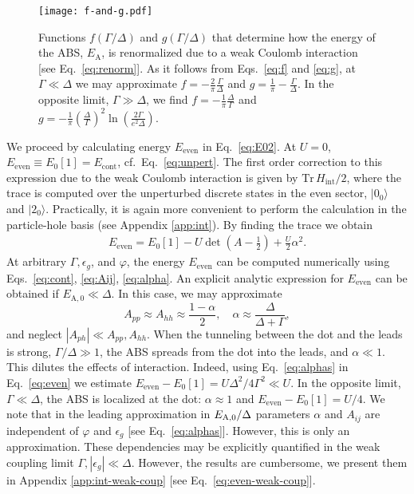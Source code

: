 \documentclass[aps,reprint,longbibliography, prb]{revtex4-2}
\begin{document}
\begin{figure}[t]
  \begin{center}
    \hspace{-20pt}\texttt{[image: f-and-g.pdf]}
    \caption{Functions $f(\Gamma/\Delta)$ and $g(\Gamma/\Delta)$ that determine how the energy of the ABS, $E_\mathrm{A}$, is renormalized due to a weak Coulomb interaction [see Eq.~\eqref{eq:renorm}]. As it follows from Eqs.~\eqref{eq:f} and \eqref{eq:g}, at $\Gamma\ll\Delta$ we may approximate $f = - \frac{2}{\pi}\frac{\Gamma}{\Delta}$ and $g = \frac{1}{\pi} - \frac{\Gamma}{\Delta}$. In the opposite limit, $\Gamma \gg \Delta$, we find $f= -\frac{1}{\pi}\frac{\Delta}{\Gamma}$ and $g=-\frac{1}{\pi}\left(\frac{\Delta}{\Gamma}\right)^2\ln\left(\frac{2\Gamma}{e^2\Delta}\right)$.
    \label{fig:f-and-g}}
  \end{center}
\end{figure}

We proceed by calculating energy $E_\mathrm{even}$ in Eq.~\eqref{eq:E02}. At $U = 0$, $E_\mathrm{even} \equiv E_0[1] = E_\mathrm{cont}$, cf.~Eq.~\eqref{eq:unpert}. The first order correction to this expression due to the weak Coulomb interaction is given by $\mathrm{Tr}\,H_\mathrm{int}/2$, where the trace is computed over the unperturbed discrete states in the even sector, $|0_0\rangle$ and $|2_0\rangle$. Practically, it is again more convenient to perform the calculation in the particle-hole basis (see Appendix \ref{app:int}). By finding the trace we obtain
\begin{gather}
    \label{eq:even}
    E_\mathrm{even} = E_0[1] - U\det\left(A - \frac{1}{2}\right) + \frac{U}{2}\alpha^2.
\end{gather}
At arbitrary $\Gamma,\epsilon_g$, and $\varphi$, the energy $E_\mathrm{even}$ can be computed numerically using Eqs.~\eqref{eq:cont}, \eqref{eq:Aij}, \eqref{eq:alpha}. An explicit analytic expression for $E_\mathrm{even}$ can be obtained if $E_\mathrm{A,0}\ll \Delta$. In this case, we may approximate
\begin{equation}
    \label{eq:alphas}
    A_{pp}\approx A_{hh} \approx \frac{1-\alpha}{2},\quad \alpha \approx \frac{\Delta}{\Delta + \Gamma},
\end{equation}
and neglect $|A_{ph}|\ll A_{pp}, A_{hh}$.
When the tunneling between the dot and the leads is strong, $\Gamma/\Delta \gg 1$, the ABS spreads from the dot into the leads, and $\alpha \ll 1$.
This dilutes the effects of interaction. Indeed, using Eq.~\eqref{eq:alphas} in Eq.~\eqref{eq:even} we estimate $E_\mathrm{even}-E_0[1] = U\Delta^2/4\Gamma^2 \ll U$. In the opposite limit, $\Gamma\ll\Delta$, the ABS is localized at the dot: $\alpha \approx 1$ and $E_\mathrm{even}-E_0[1] = U/4$. We note that in the leading approximation in $E_{\rm A,0} / \Delta$ parameters $\alpha$ and $A_{ij}$ are independent of $\varphi$ and $\epsilon_g$ [see Eq.~\eqref{eq:alphas}]. However, this is only an approximation. These dependencies may be explicitly quantified in the weak coupling limit $\Gamma, |\epsilon_g| \ll \Delta$.
However, the results are cumbersome, we present them in Appendix \ref{app:int-weak-coup} [see Eq.~\eqref{eq:even-weak-coup}].
\end{document}
